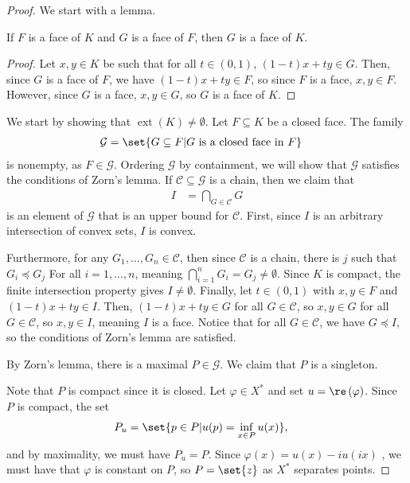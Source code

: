 \documentclass[10pt]{mypackage}
\begin{document}
\begin{proof}
  We start with a lemma.
  \begin{lemma}
    If $F$ is a face of $K$ and $G$ is a face of $F$, then $G$ is a face of $K$.
  \end{lemma}
  \begin{proof}
    Let $x,y\in K$ be such that for all $t\in (0,1)$, $\left( 1-t \right)x + ty\in G$. Then, since $G$ is a face of $F$, we have $\left( 1-t \right)x + ty \in F$, so since $F$ is a face, $x,y\in F$. However, since $G$ is a face, $x,y\in G$, so $G$ is a face of $K$.
  \end{proof}
  We start by showing that $\operatorname{ext}\left( K \right)\neq\emptyset$. Let $F\subseteq K$ be a closed face. The family
  \begin{align*}
    \mathcal{G} &= \set{G\subseteq F | G\text{ is a closed face in }F}
  \end{align*}
  is nonempty, as $F\in \mathcal{G}$. Ordering $\mathcal{G}$ by containment, we will show that $\mathcal{G}$ satisfies the conditions of Zorn's lemma. If $\mathcal{C}\subseteq \mathcal{G}$ is a chain, then we claim that
  \begin{align*}
    I &= \bigcap_{G\in \mathcal{C}} G
  \end{align*}
  is an element of $\mathcal{G}$ that is an upper bound for $\mathcal{C}$. First, since $I$ is an arbitrary intersection of convex sets, $I$ is convex.\newline

  Furthermore, for any $G_1,\dots,G_n\in \mathcal{C}$, then since $\mathcal{C}$ is a chain, there is $j$ such that $G_i\preceq G_j$ For all $i=1,\dots,n$, meaning $\bigcap_{i=1}^{n}G_i = G_j\neq \emptyset$. Since $K$ is compact, the finite intersection property gives $I\neq\emptyset$. Finally, let $t\in (0,1)$ with $x,y\in F$ and $\left( 1-t \right)x + ty\in I$. Then, $\left( 1-t \right)x + ty\in G$ for all $G\in \mathcal{C}$, so $x,y\in G$ for all $G\in \mathcal{C}$, so $x,y\in I$, meaning $I$ is a face. Notice that for all $G\in \mathcal{C}$, we have $G\preceq I$, so the conditions of Zorn's lemma are satisfied.\newline

  By Zorn's lemma, there is a maximal $P\in \mathcal{G}$. We claim that $P$ is a singleton.\newline

  Note that $P$ is compact since it is closed. Let $\varphi\in X^{\ast}$ and set $u = \re\left( \varphi \right)$. Since $P$ is compact, the set
  \begin{align*}
    P_u &= \set{p\in P | u(p) = \inf_{x\in P}u(x)},
  \end{align*}
  and by maximality, we must have $P_u = P$. Since $\varphi(x)= u(x) -iu\left( ix \right)$ , we must have that $\varphi$ is constant on $P$, so $P = \set{z}$ as $X^{\ast}$ separates points. \newline


\end{proof}
\end{document}
